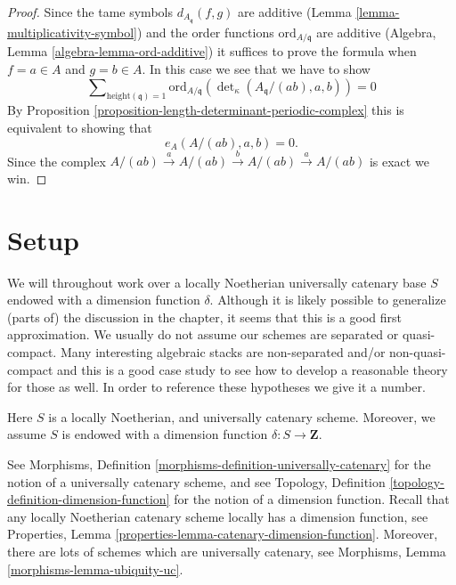 \begin{proof}
Since the tame symbols $d_{A_{\mathfrak q}}(f, g)$ are additive
(Lemma \ref{lemma-multiplicativity-symbol}) and the order
functions $\text{ord}_{A/\mathfrak q}$
are additive (Algebra, Lemma \ref{algebra-lemma-ord-additive})
it suffices to prove the formula when $f = a \in A$ and
$g = b \in A$. In this case we see that we have to show
$$
\sum\nolimits_{\text{height}(\mathfrak q) = 1}
\text{ord}_{A/\mathfrak q}(\det\nolimits_\kappa(A_{\mathfrak q}/(ab), a, b))
= 0
$$
By Proposition \ref{proposition-length-determinant-periodic-complex}
this is equivalent to showing that
$$
e_A(A/(ab), a, b) = 0.
$$
Since the complex
$A/(ab) \xrightarrow{a} A/(ab) \xrightarrow{b} A/(ab) \xrightarrow{a} A/(ab)$
is exact we win.
\end{proof}






















\section{Setup}
\label{section-setup}

\noindent
We will throughout work over a locally Noetherian universally
catenary base $S$ endowed with a dimension function $\delta$.
Although it is likely possible to generalize (parts of) the
discussion in the chapter, it seems that this is a good first
approximation. We usually do not assume our schemes are
separated or quasi-compact. Many interesting algebraic stacks
are non-separated and/or non-quasi-compact and this is a good
case study to see how to develop a reasonable theory for those as well.
In order to reference these hypotheses we give it a number.

\begin{situation}
\label{situation-setup}
Here $S$ is a locally Noetherian, and universally catenary scheme.
Moreover, we assume $S$ is endowed with a dimension function
$\delta : S \longrightarrow \mathbf{Z}$.
\end{situation}

\noindent
See Morphisms, Definition \ref{morphisms-definition-universally-catenary}
for the notion of a universally catenary scheme, and see
Topology, Definition \ref{topology-definition-dimension-function}
for the notion of a dimension function. Recall that any locally
Noetherian catenary scheme locally has a dimension function, see
Properties, Lemma \ref{properties-lemma-catenary-dimension-function}.
Moreover, there are lots of schemes which are universally catenary,
see Morphisms, Lemma \ref{morphisms-lemma-ubiquity-uc}.

